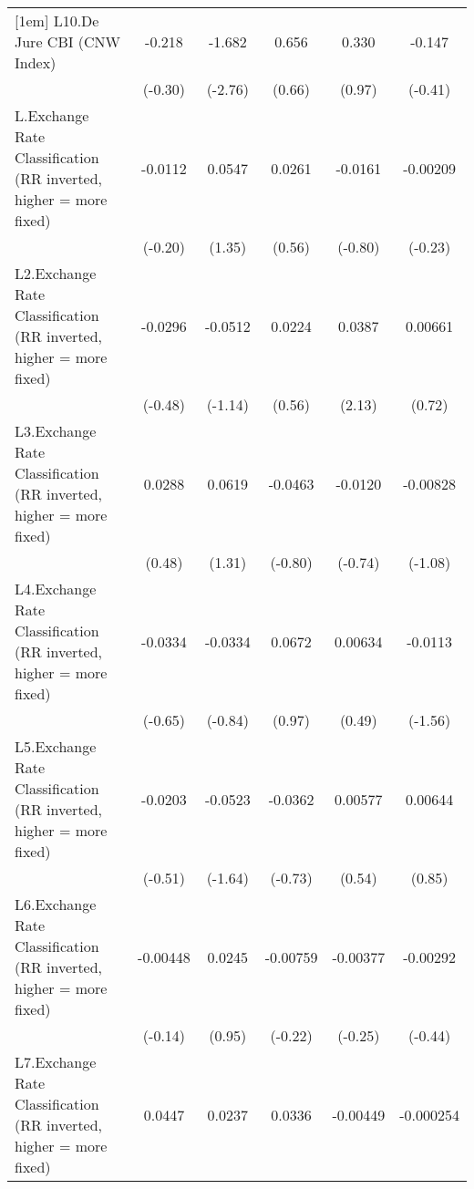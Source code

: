 {\begin{longtable}{l*{5}{c}}
[1em]
L10.De Jure CBI (CNW Index)&   -0.218         &   -1.682\sym{**} &    0.656         &    0.330         &   -0.147         \\
                &  (-0.30)         &  (-2.76)         &   (0.66)         &   (0.97)         &  (-0.41)         \\
[1em]
L.Exchange Rate Classification (RR inverted, higher = more fixed)&  -0.0112         &   0.0547         &   0.0261         &  -0.0161         & -0.00209         \\
                &  (-0.20)         &   (1.35)         &   (0.56)         &  (-0.80)         &  (-0.23)         \\
[1em]
L2.Exchange Rate Classification (RR inverted, higher = more fixed)&  -0.0296         &  -0.0512         &   0.0224         &   0.0387\sym{*}  &  0.00661         \\
                &  (-0.48)         &  (-1.14)         &   (0.56)         &   (2.13)         &   (0.72)         \\
[1em]
L3.Exchange Rate Classification (RR inverted, higher = more fixed)&   0.0288         &   0.0619         &  -0.0463         &  -0.0120         & -0.00828         \\
                &   (0.48)         &   (1.31)         &  (-0.80)         &  (-0.74)         &  (-1.08)         \\
[1em]
L4.Exchange Rate Classification (RR inverted, higher = more fixed)&  -0.0334         &  -0.0334         &   0.0672         &  0.00634         &  -0.0113         \\
                &  (-0.65)         &  (-0.84)         &   (0.97)         &   (0.49)         &  (-1.56)         \\
[1em]
L5.Exchange Rate Classification (RR inverted, higher = more fixed)&  -0.0203         &  -0.0523         &  -0.0362         &  0.00577         &  0.00644         \\
                &  (-0.51)         &  (-1.64)         &  (-0.73)         &   (0.54)         &   (0.85)         \\
[1em]
L6.Exchange Rate Classification (RR inverted, higher = more fixed)& -0.00448         &   0.0245         & -0.00759         & -0.00377         & -0.00292         \\
                &  (-0.14)         &   (0.95)         &  (-0.22)         &  (-0.25)         &  (-0.44)         \\
[1em]
L7.Exchange Rate Classification (RR inverted, higher = more fixed)&   0.0447         &   0.0237         &   0.0336         & -0.00449         &-0.000254         \\

\end{longtable}}
